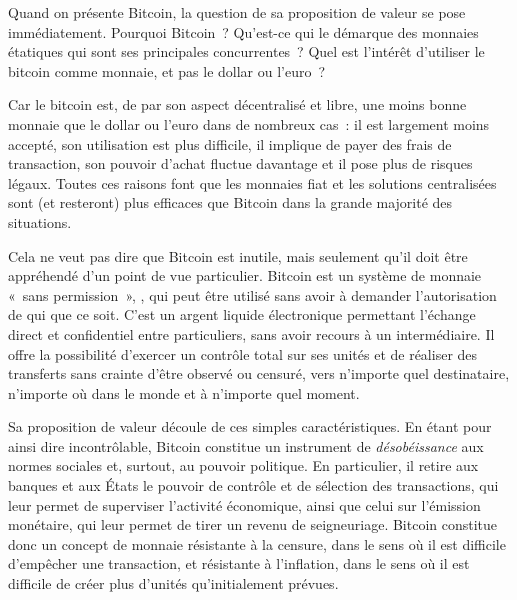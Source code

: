 Quand on présente Bitcoin, la question de sa proposition de valeur se pose immédiatement. Pourquoi Bitcoin~? Qu'est-ce qui le démarque des monnaies étatiques qui sont ses principales concurrentes~? Quel est l'intérêt d'utiliser le bitcoin comme monnaie, et pas le dollar ou l'euro~?

Car le bitcoin est, de par son aspect décentralisé et libre, une moins bonne monnaie que le dollar ou l'euro dans de nombreux cas~: il est largement moins accepté, son utilisation est plus difficile, il implique de payer des frais de transaction, son pouvoir d'achat fluctue davantage et il pose plus de risques légaux. Toutes ces raisons font que les monnaies fiat et les solutions centralisées sont (et resteront) plus efficaces que Bitcoin dans la grande majorité des situations.

Cela ne veut pas dire que Bitcoin est inutile, mais seulement qu'il doit être appréhendé d'un point de vue particulier. Bitcoin est un système de monnaie «~sans permission~», , qui peut être utilisé sans avoir à demander l'autorisation de qui que ce soit. C'est un argent liquide électronique permettant l'échange direct et confidentiel entre particuliers, sans avoir recours à un intermédiaire. Il offre la possibilité d'exercer un contrôle total sur ses unités et de réaliser des transferts sans crainte d'être observé ou censuré, vers n'importe quel destinataire, n'importe où dans le monde et à n'importe quel moment.

Sa proposition de valeur découle de ces simples caractéristiques. En étant pour ainsi dire incontrôlable, Bitcoin constitue un instrument de \emph{désobéissance} aux normes sociales et, surtout, au pouvoir politique. En particulier, il retire aux banques et aux États le pouvoir de contrôle et de sélection des transactions, qui leur permet de superviser l'activité économique, ainsi que celui sur l'émission monétaire, qui leur permet de tirer un revenu de seigneuriage. Bitcoin constitue donc un concept de monnaie résistante à la censure, dans le sens où il est difficile d'empêcher une transaction, et résistante à l'inflation, dans le sens où il est difficile de créer plus d'unités qu'initialement prévues.


